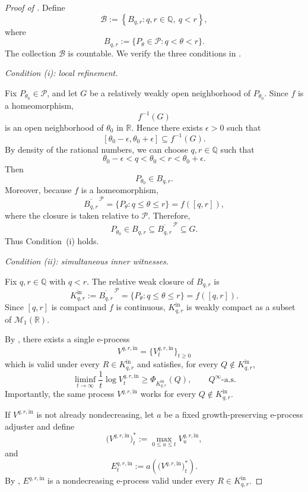 \documentclass[10pt,a4paper]{amsart}
\begin{document}
\begin{proof}[Proof of ]
Define
\[
    \mathscr B
    :=
    \left\{
        B_{q,r}:
        q,r\in\mathbb Q,\ q<r
    \right\},
\]
where
\[
    B_{q,r}
    :=
    \{P_\theta\in\mathcal P:q<\theta<r\}.
\]
The collection $\mathscr B$ is countable. We verify the three
conditions in .

\medskip

\noindent
\emph{Condition \textup{(i)}: local refinement.}

Fix $P_{\theta_0}\in\mathcal P$, and let $G$ be a relatively
weakly open neighborhood of $P_{\theta_0}$. Since $f$ is a
homeomorphism,
\[
    f^{-1}(G)
\]
is an open neighborhood of $\theta_0$ in $\mathbb R$. Hence
there exists $\epsilon>0$ such that
\[
    [\theta_0-\epsilon,\theta_0+\epsilon]
    \subseteq
    f^{-1}(G).
\]
By density of the rational numbers, we can choose
$q,r\in\mathbb Q$ such that
\[
    \theta_0-\epsilon<q<\theta_0<r<\theta_0+\epsilon.
\]
Then
\[
    P_{\theta_0}\in B_{q,r}.
\]
Moreover, because $f$ is a homeomorphism,
\[
    \overline{B_{q,r}}^{\,\mathcal P}
    =
    \{P_\theta:q\le\theta\le r\}
    =
    f([q,r]),
\]
where the closure is taken relative to $\mathcal P$. Therefore,
\[
    P_{\theta_0}
    \in
    B_{q,r}
    \subseteq
    \overline{B_{q,r}}^{\,\mathcal P}
    \subseteq
    G.
\]
Thus Condition~\textup{(i)} holds.

\medskip

\noindent
\emph{Condition \textup{(ii)}: simultaneous inner witnesses.}

Fix $q,r\in\mathbb Q$ with $q<r$. The relative weak closure of
$B_{q,r}$ is
\[
    K_{q,r}^{\mathrm{in}}
    :=
    \overline{B_{q,r}}^{\,\mathcal P}
    =
    \{P_\theta:q\le\theta\le r\}
    =
    f([q,r]).
\]
Since $[q,r]$ is compact and $f$ is continuous,
$K_{q,r}^{\mathrm{in}}$ is weakly compact as a subset of
$\mathcal M_1(\mathbb R)$.

By , there exists a single
e-process
\[
    V^{q,r,\mathrm{in}}
    =
    \{V_t^{q,r,\mathrm{in}}\}_{t\ge0}
\]
which is valid under every $R\in K_{q,r}^{\mathrm{in}}$ and
satisfies, for every
$Q\notin K_{q,r}^{\mathrm{in}}$,
\[
    \liminf_{t\to\infty}
    \frac1t
    \log V_t^{q,r,\mathrm{in}}
    \ge
    \Phi_{K_{q,r}^{\mathrm{in}}}(Q),
    \qquad
    Q^\infty\text{-a.s.}
\]
Importantly, the same process $V^{q,r,\mathrm{in}}$ works for
every $Q\notin K_{q,r}^{\mathrm{in}}$.

If $V^{q,r,\mathrm{in}}$ is not already nondecreasing, let $a$
be a fixed growth-preserving e-process adjuster and define
\[
    \bigl(V^{q,r,\mathrm{in}}\bigr)_t^*
    :=
    \max_{0\le u\le t}
    V_u^{q,r,\mathrm{in}},
\]
and
\[
    E_t^{q,r,\mathrm{in}}
    :=
    a\left(
        \bigl(V^{q,r,\mathrm{in}}\bigr)_t^*
    \right).
\]
By ,
$E^{q,r,\mathrm{in}}$ is a nondecreasing e-process valid under
every $R\in K_{q,r}^{\mathrm{in}}$.


\end{proof}
\end{document}
